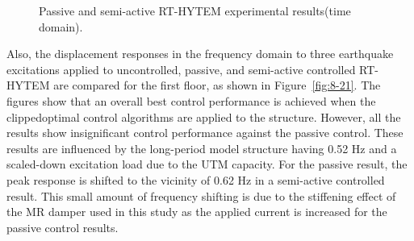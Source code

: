 \begin{figure}[H]
\centering
{}
\caption{Passive and semi-active RT-HYTEM experimental results(time domain).}
\label{fig:8-20}
\end{figure}

Also, the displacement responses in the frequency domain to three earthquake excitations applied to uncontrolled, passive, and semi-active controlled RT-HYTEM are compared for the first floor, as shown in Figure~\ref{fig:8-21}. The figures show that an overall best control performance is achieved when the clippedoptimal control algorithms are applied to the structure. However, all the results show insignificant control performance against the passive control. These results are influenced by the long-period model structure having 0.52 Hz and a scaled-down excitation load due to the UTM capacity. For the passive result, the peak response is shifted to the vicinity of 0.62 Hz in a semi-active controlled result. This small amount of frequency shifting is due to the stiffening effect of the MR damper used in this study as the applied current is increased for the passive control results.

